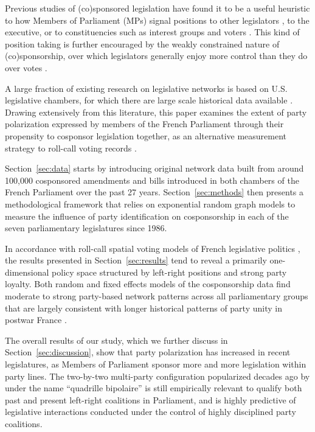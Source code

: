 
Previous studies of (co)sponsored legislation have found it to be a useful heuristic to how Members of Parliament (MPs) signal positions to other legislators \citep{KesslerKrehbiel1996-APSR}, to the executive, or to constituencies such as interest groups and voters \citep{WilsonYoung1997-LSQ}. This kind of position taking is further encouraged by the weakly constrained nature of (co)sponsorship, over which legislators generally enjoy more control than they do over votes \citep{Schiller1995-AJPS}.%

A large fraction of existing research on legislative networks is based on U.S. legislative chambers, for which there are large scale historical data available \citep{ZhangFriend2008-P,ClarkOsborn2009-SPPQ}. Drawing extensively from this literature, this paper examines the extent of party polarization expressed by members of the French Parliament through their propensity to cosponsor legislation together, as an alternative  measurement strategy to roll-call voting records \citep{Sauger2010}.%

Section~\ref{sec:data} starts by introducing original network data built from around 100,000 cosponsored amendments and bills introduced in both chambers of the French Parliament over the past 27 years. Section~\ref{sec:methods} then presents a methodological framework that relies on exponential random graph models \citep{KrivitskyHandcock2009-SN,CranmerDesmarais2011-PA} to measure the influence of party identification on cosponsorship in each of the seven parliamentary legislatures since 1986.%

In accordance with roll-call spatial voting models of French legislative politics \citep{GodboutFoucault2013-FP}, the results presented in Section~\ref{sec:results} tend to reveal a primarily one-dimensional policy space structured by left-right positions and strong party loyalty. Both random and fixed effects models of the cosponsorship data find moderate to strong party-based network patterns across all parliamentary groups that are largely consistent with longer historical patterns of party unity in postwar France \citep{Sauger2010}.%

The overall results of our study, which we further discuss in Section~\ref{sec:discussion}, show that party polarization has increased in recent legislatures, as Members of Parliament sponsor more and more legislation within party lines. The two-by-two multi-party configuration popularized decades ago by \citet{Duverger1968-PUF} under the name ``quadrille bipolaire'' is still empirically relevant to qualify both past and present left-right coalitions in Parliament, and is highly predictive of legislative interactions conducted under the control of highly disciplined party coalitions.%
